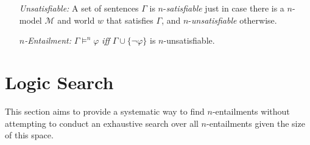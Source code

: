 \documentclass[a4paper, 11pt]{article} %
\newcommand{\set}[1]{\lbrace#1\rbrace} %
\newcommand{\M}[0]{\mathcal{M}}
\begin{document}
\begin{enumerate}
  \item[\it Unsatisfiable:] A set of sentences $\Gamma$ is $n$-\textit{satisfiable} just in case there is a $n$-model $\M$ and world $w$ that satisfies $\Gamma$, and $n$-\textit{unsatisfiable} otherwise.
  \item[\it $n$-Entailment:] $\Gamma \vDash^n \varphi$ \textit{iff} $\Gamma\cup\set{\neg\varphi}$ is $n$-unsatisfiable. 
\end{enumerate}





\section{Logic Search}

This section aims to provide a systematic way to find $n$-entailments without attempting to conduct an exhaustive search over all $n$-entailments given the size of this space.



\end{document}
